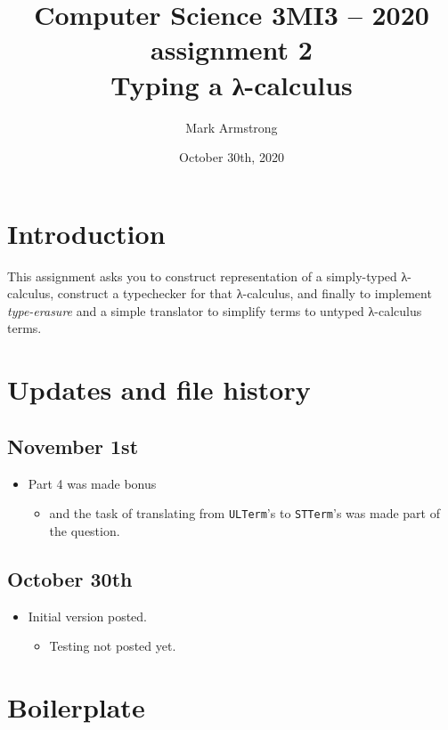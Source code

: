 \documentclass[11pt]{article}
\author{Mark Armstrong}
\date{October 30th, 2020}
\title{Computer Science 3MI3 – 2020 assignment 2\\\medskip
\large Typing a λ-calculus}
\begin{document}
\maketitle
\tableofcontents


\section*{Introduction}
\label{sec:org7b8bf9e}
This assignment asks you to construct representation
of a simply-typed λ-calculus, construct a typechecker for that
λ-calculus, and finally to implement \emph{type-erasure} and a
simple translator to simplify terms to untyped λ-calculus terms.

\section*{Updates and file history}
\label{sec:orge88a3e8}
\subsection*{November 1st}
\label{sec:orge7bd119}
\begin{itemize}
\item Part 4 was made bonus
\begin{itemize}
\item and the task of translating from \texttt{ULTerm}'s to \texttt{STTerm}'s was
made part of the question.
\end{itemize}
\end{itemize}

\subsection*{October 30th}
\label{sec:org3c3b91a}
\begin{itemize}
\item Initial version posted.
\begin{itemize}
\item Testing not posted yet.
\end{itemize}
\end{itemize}

\section*{Boilerplate}
\label{sec:orge6f8c03}
\end{document}
